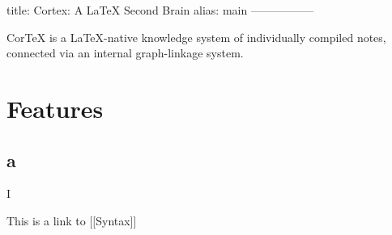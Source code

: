 title: Cortex: A \LaTeX{} Second Brain
alias: main
-----------------

CorTeX is a LaTeX-native knowledge system of individually compiled notes, connected via an internal graph-linkage system.

\section*{Features}

\subsection{a}

I 

This is a link to [[Syntax]]